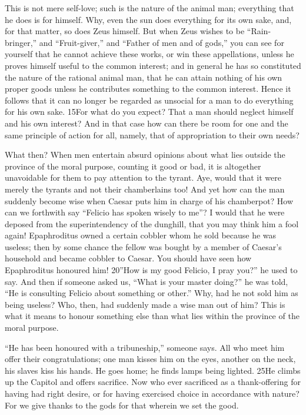 This is not mere self-love; such is the nature of the animal man; everything that he does is for himself. Why, even the sun does everything for its own sake, and, for that matter, so does Zeus himself. But when Zeus wishes to be ``Rain-bringer,'' and ``Fruit-giver,'' and ``Father of men and of gods,'' you can see for yourself that he cannot achieve these works, or win these appellations, unless he proves himself useful to the common interest; and in general he has so constituted the nature of the rational animal man, that he can attain nothing of his own proper goods unless he contributes something to the common interest. Hence it follows that it can no longer be regarded as unsocial for a man to do everything for his own sake. 15For what do you expect? That a man should neglect himself and his own interest? And in that case how can there be room for one and the same principle of action for all, namely, that of appropriation to their own needs?

What then? When men entertain absurd opinions about what lies outside the province of the moral purpose, counting it good or bad, it is altogether unavoidable for them to pay attention to the tyrant. Aye, would that it were merely the tyrants and not their chamberlains too! And yet how can the man suddenly become wise when Caesar puts him in charge of his chamberpot? How can we forthwith say ``Felicio has spoken wisely to me''? I would that he were deposed from the superintendency of the dunghill, that you may think him a fool again! Epaphroditus owned a certain cobbler whom he sold because he was useless; then by some chance the fellow was bought by a member of Caesar's household and became cobbler to Caesar. You should have seen how Epaphroditus honoured him! 20''How is my good Felicio, I pray you?'' he used to say. And then if someone asked us, ``What is your master doing?'' he was told, ``He is consulting Felicio about something or other.'' Why, had he not sold him as being useless? Who, then, had suddenly made a wise man out of him? This is what it means to honour something else than what lies within the province of the moral purpose.

``He has been honoured with a tribuneship,'' someone says. All who meet him offer their congratulations; one man kisses him on the eyes, another on the neck, his slaves kiss his hands. He goes home; he finds lamps being lighted. 25He climbs up the Capitol and offers sacrifice. Now who ever sacrificed as a thank-offering for having had right desire, or for having exercised choice in accordance with nature? For we give thanks to the gods for that wherein we set the good.

